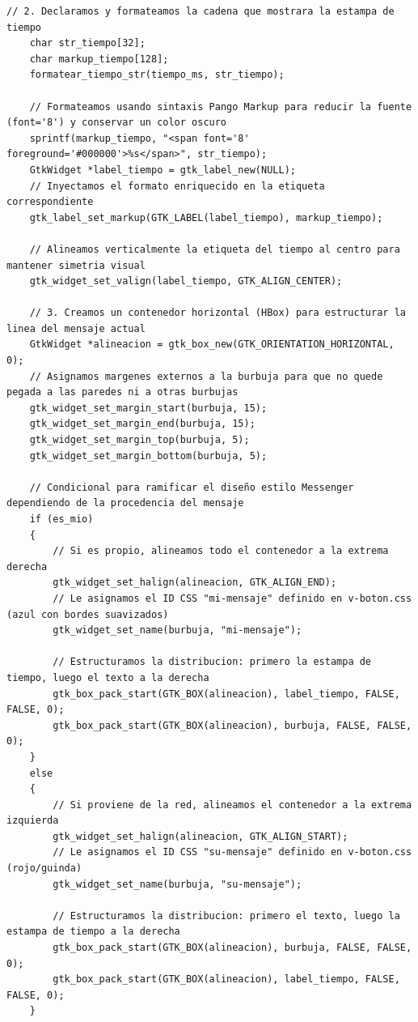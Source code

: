 \begin{lstlisting}[style=estiloC, caption={Archivo del Front-End (conexion P2P)}]
    // 2. Declaramos y formateamos la cadena que mostrara la estampa de tiempo
    char str_tiempo[32];
    char markup_tiempo[128];
    formatear_tiempo_str(tiempo_ms, str_tiempo);

    // Formateamos usando sintaxis Pango Markup para reducir la fuente (font='8') y conservar un color oscuro
    sprintf(markup_tiempo, "<span font='8' foreground='#000000'>%s</span>", str_tiempo);
    GtkWidget *label_tiempo = gtk_label_new(NULL);
    // Inyectamos el formato enriquecido en la etiqueta correspondiente
    gtk_label_set_markup(GTK_LABEL(label_tiempo), markup_tiempo);

    // Alineamos verticalmente la etiqueta del tiempo al centro para mantener simetria visual
    gtk_widget_set_valign(label_tiempo, GTK_ALIGN_CENTER);

    // 3. Creamos un contenedor horizontal (HBox) para estructurar la linea del mensaje actual
    GtkWidget *alineacion = gtk_box_new(GTK_ORIENTATION_HORIZONTAL, 0);
    // Asignamos margenes externos a la burbuja para que no quede pegada a las paredes ni a otras burbujas
    gtk_widget_set_margin_start(burbuja, 15);
    gtk_widget_set_margin_end(burbuja, 15);
    gtk_widget_set_margin_top(burbuja, 5);
    gtk_widget_set_margin_bottom(burbuja, 5);

    // Condicional para ramificar el diseño estilo Messenger dependiendo de la procedencia del mensaje
    if (es_mio)
    {
        // Si es propio, alineamos todo el contenedor a la extrema derecha
        gtk_widget_set_halign(alineacion, GTK_ALIGN_END);
        // Le asignamos el ID CSS "mi-mensaje" definido en v-boton.css (azul con bordes suavizados)
        gtk_widget_set_name(burbuja, "mi-mensaje");

        // Estructuramos la distribucion: primero la estampa de tiempo, luego el texto a la derecha
        gtk_box_pack_start(GTK_BOX(alineacion), label_tiempo, FALSE, FALSE, 0);
        gtk_box_pack_start(GTK_BOX(alineacion), burbuja, FALSE, FALSE, 0);
    }
    else
    {
        // Si proviene de la red, alineamos el contenedor a la extrema izquierda
        gtk_widget_set_halign(alineacion, GTK_ALIGN_START);
        // Le asignamos el ID CSS "su-mensaje" definido en v-boton.css (rojo/guinda)
        gtk_widget_set_name(burbuja, "su-mensaje");

        // Estructuramos la distribucion: primero el texto, luego la estampa de tiempo a la derecha
        gtk_box_pack_start(GTK_BOX(alineacion), burbuja, FALSE, FALSE, 0);
        gtk_box_pack_start(GTK_BOX(alineacion), label_tiempo, FALSE, FALSE, 0);
    }


\end{lstlisting}

